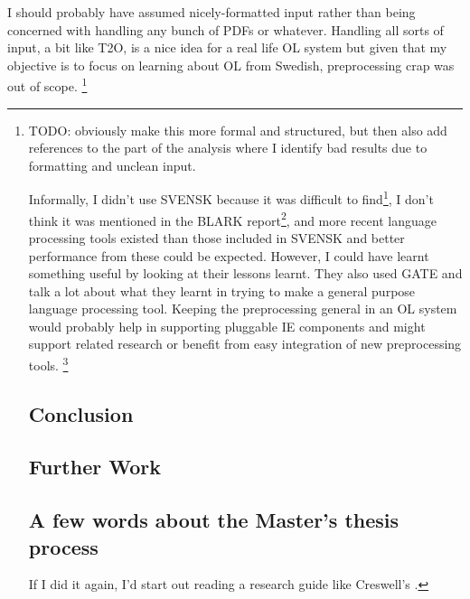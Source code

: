 \documentclass[a4paper]{report}
\newcommand{\todo}[1]{\footnote{{\color{red} TODO: #1}}}
\begin{document}
I should probably have assumed nicely-formatted input rather than being concerned with handling any bunch of PDFs or whatever.
Handling all sorts of input, a bit like T2O, is a nice idea for a real life OL system but given that my objective is to focus on learning about OL from Swedish, preprocessing crap was out of scope. 
\todo{obviously make this more formal and structured, but then also add references to the part of the analysis where I identify bad results due to formatting and unclean input.

Informally, I didn't use SVENSK because it was difficult to find\footnote{try googling SVENSK language processing, and the URL in \cite{Olsson98SVENSKTagging} is broken, I only just found the old site in the internet archive wayback machine}, I don't think it was mentioned in the BLARK report\todo{check}, and more recent language processing tools existed than those included in SVENSK and better performance from these could be expected.
However, I could have learnt something useful by looking at their lessons learnt.
They also used GATE and talk a lot about what they learnt in trying to make a general purpose language processing tool.
Keeping the preprocessing general in an OL system would probably help in supporting pluggable IE components and might support related research or benefit from easy integration of new preprocessing tools. \todo{formalize this para}


\chapter{Conclusion}

\section{Further Work}

\section{A few words about the Master's thesis process}

If I did it again, I'd start out reading a research guide like Creswell's \cite{creswell2003research}.

}
\end{document}
